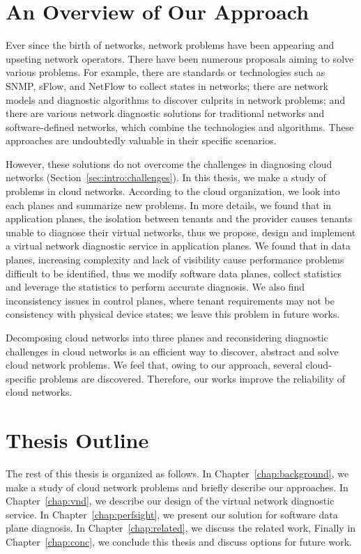 \section{An Overview of Our Approach}
\label{sec:intro:approach}
Ever since the birth of networks, network problems have been appearing and upseting network operators. There have been numerous proposals aiming to solve various problems. For example, there are standards or technologies such as SNMP, sFlow, and NetFlow to collect states in networks; there are network models and diagnostic algorithms to discover culprits in network problems; and there are various network diagnostic solutions for traditional networks and software-defined networks, which combine the technologies and algorithms. These approaches are undoubtedly valuable in their specific scenarios.

However, these solutions do not overcome the challenges in diagnosing cloud networks (Section~\ref{sec:intro:challenges}). In this thesis, we make a study of problems in cloud networks. According to the cloud organization, we look into each planes and summarize new problems. In more details, we found that in application planes, the isolation between tenants and the provider causes tenants unable to diagnose their virtual networks, thus we propose, design and implement a virtual network diagnostic service in application planes. We found that in data planes, increasing complexity and lack of visibility cause performance problems difficult to be identified, thus we modify software data planes, collect statistics and leverage the statistics to perform accurate diagnosis. We also find inconsistency issues in control planes, where tenant requirements may not be consistency with physical device states; we leave this problem in future works.

Decomposing cloud networks into three planes and reconsidering diagnostic challenges in cloud networks is an efficient way to discover, abstract and solve cloud network problems. We feel that, owing to our approach, several cloud-specific problems are discovered. Therefore, our works improve the reliability of cloud networks.

\section{Thesis Outline}
\label{sec:intro:outline}
The rest of this thesis is organized as follows. 
In Chapter~\ref{chap:background}, we make a study of cloud network problems and briefly describe our approaches.
In Chapter~\ref{chap:vnd},
we describe our design of the virtual network diagnostic service. In Chapter~\ref{chap:perfsight},
we present our solution for software data plane diagnosis.
In Chapter~\ref{chap:related}, we discuss the related work, 
Finally in Chapter~\ref{chap:conc}, we conclude this thesis and discuss options for future work.
